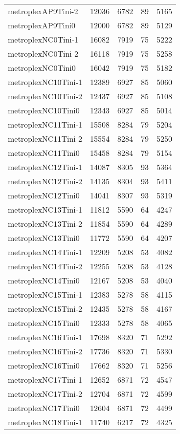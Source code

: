\begin{longtable}{lrrrr}
metroplexAP9Tini-2 & 12036 & 6782 & 89 & 5165 \\
metroplexAP9Tini0 & 12000 & 6782 & 89 & 5129 \\
metroplexNC0Tini-1 & 16082 & 7919 & 75 & 5222 \\
metroplexNC0Tini-2 & 16118 & 7919 & 75 & 5258 \\
metroplexNC0Tini0 & 16042 & 7919 & 75 & 5182 \\
metroplexNC10Tini-1 & 12389 & 6927 & 85 & 5060 \\
metroplexNC10Tini-2 & 12437 & 6927 & 85 & 5108 \\
metroplexNC10Tini0 & 12343 & 6927 & 85 & 5014 \\
metroplexNC11Tini-1 & 15508 & 8284 & 79 & 5204 \\
metroplexNC11Tini-2 & 15554 & 8284 & 79 & 5250 \\
metroplexNC11Tini0 & 15458 & 8284 & 79 & 5154 \\
metroplexNC12Tini-1 & 14087 & 8305 & 93 & 5364 \\
metroplexNC12Tini-2 & 14135 & 8304 & 93 & 5411 \\
metroplexNC12Tini0 & 14041 & 8307 & 93 & 5319 \\
metroplexNC13Tini-1 & 11812 & 5590 & 64 & 4247 \\
metroplexNC13Tini-2 & 11854 & 5590 & 64 & 4289 \\
metroplexNC13Tini0 & 11772 & 5590 & 64 & 4207 \\
metroplexNC14Tini-1 & 12209 & 5208 & 53 & 4082 \\
metroplexNC14Tini-2 & 12255 & 5208 & 53 & 4128 \\
metroplexNC14Tini0 & 12167 & 5208 & 53 & 4040 \\
metroplexNC15Tini-1 & 12383 & 5278 & 58 & 4115 \\
metroplexNC15Tini-2 & 12435 & 5278 & 58 & 4167 \\
metroplexNC15Tini0 & 12333 & 5278 & 58 & 4065 \\
metroplexNC16Tini-1 & 17698 & 8320 & 71 & 5292 \\
metroplexNC16Tini-2 & 17736 & 8320 & 71 & 5330 \\
metroplexNC16Tini0 & 17662 & 8320 & 71 & 5256 \\
metroplexNC17Tini-1 & 12652 & 6871 & 72 & 4547 \\
metroplexNC17Tini-2 & 12704 & 6871 & 72 & 4599 \\
metroplexNC17Tini0 & 12604 & 6871 & 72 & 4499 \\
metroplexNC18Tini-1 & 11740 & 6217 & 72 & 4325 \\

\end{longtable}
